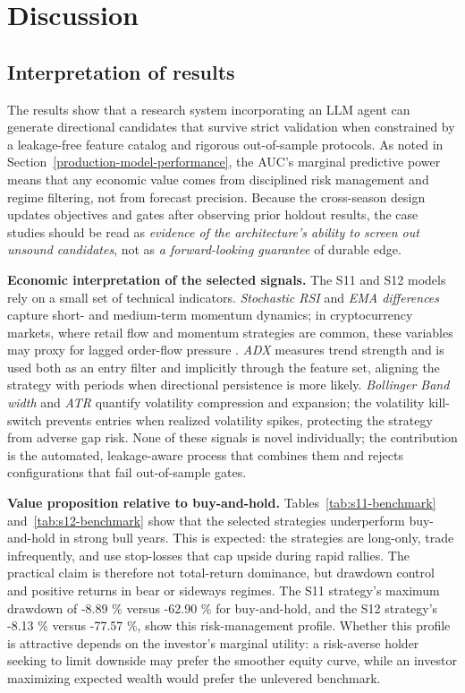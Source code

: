 \documentclass[analytics,article,submit,pdftex,moreauthors]{Definitions/mdpi}
\begin{document}
\section{Discussion}\label{discussion}

\subsection{Interpretation of results}\label{interpretation-of-results}

The results show that a research system incorporating an LLM agent can generate directional candidates that survive strict validation when constrained by a leakage-free feature catalog and rigorous out-of-sample protocols. As noted in Section~\ref{production-model-performance}, the AUC's marginal predictive power means that any economic value comes from disciplined risk management and regime filtering, not from forecast precision. Because the cross-season design updates objectives and gates after observing prior holdout results, the case studies should be read as \emph{evidence of the architecture's ability to screen out unsound candidates}, not as \emph{a forward-looking guarantee} of durable edge.

\textbf{Economic interpretation of the selected signals.} The S11 and S12 models rely on a small set of technical indicators. \emph{Stochastic RSI} and \emph{EMA differences} capture short- and medium-term momentum dynamics; in cryptocurrency markets, where retail flow and momentum strategies are common, these variables may proxy for lagged order-flow pressure \citep{sobreiro_2026}. \emph{ADX} measures trend strength and is used both as an entry filter and implicitly through the feature set, aligning the strategy with periods when directional persistence is more likely. \emph{Bollinger Band width} and \emph{ATR} quantify volatility compression and expansion; the volatility kill-switch prevents entries when realized volatility spikes, protecting the strategy from adverse gap risk. None of these signals is novel individually; the contribution is the automated, leakage-aware process that combines them and rejects configurations that fail out-of-sample gates.

\textbf{Value proposition relative to buy-and-hold.} Tables~\ref{tab:s11-benchmark} and~\ref{tab:s12-benchmark} show that the selected strategies underperform buy-and-hold in strong bull years. This is expected: the strategies are long-only, trade infrequently, and use stop-losses that cap upside during rapid rallies. The practical claim is therefore not total-return dominance, but drawdown control and positive returns in bear or sideways regimes. The S11 strategy's maximum drawdown of -8.89 \% versus -62.90 \% for buy-and-hold, and the S12 strategy's -8.13 \% versus -77.57 \%, show this risk-management profile. Whether this profile is attractive depends on the investor's marginal utility: a risk-averse holder seeking to limit downside may prefer the smoother equity curve, while an investor maximizing expected wealth would prefer the unlevered benchmark.
\end{document}
